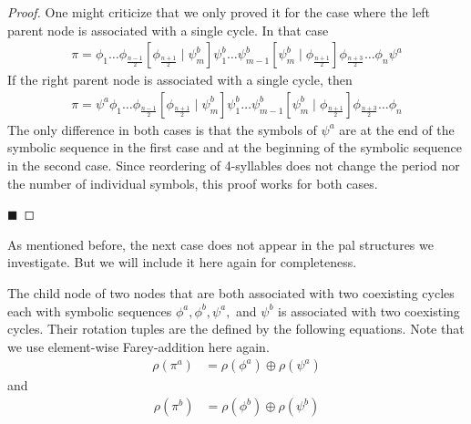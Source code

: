 \begin{proof}
	One might criticize that we only proved it for the case where the left parent node is associated with a single cycle.
	In that case
	\begin{align*}
		\pi = \phi_1 \dots \phi_{\frac{n-1}{2}} \left[\phi_{\frac{n+1}{2}} \mid \psi^b_m\right] \psi^b_1 \dots \psi^b_{m-1} \left[\psi^b_m \mid \phi_{\frac{n+1}{2}}\right] \phi_{\frac{n+3}{2}} \dots \phi_n \psi^a
	\end{align*}
	If the right parent node is associated with a single cycle, then
	\begin{align*}
		\pi = \psi^a \phi_1 \dots \phi_{\frac{n-1}{2}} \left[\phi_{\frac{n+1}{2}} \mid \psi^b_m\right] \psi^b_1 \dots \psi^b_{m-1} \left[\psi^b_m \mid \phi_{\frac{n+1}{2}}\right] \phi_{\frac{n+3}{2}} \dots \phi_n
	\end{align*}
	The only difference in both cases is that the symbols of $\psi^a$ are at the end of the symbolic sequence in the first case and at the beginning of the symbolic sequence in the second case.
	Since reordering of 4-syllables does not change the period nor the number of individual symbols, this proof works for both cases.

	\hfill $\blacksquare$
\end{proof}

As mentioned before, the next case does not appear in the \gls{pal} structures we investigate.
But we will include it here again for completeness.

\begin{theorem}
	The child node of two nodes that are both associated with two coexisting cycles each with symbolic sequences $\phi^a, \phi^b, \psi^a,$ and $\psi^b$ is associated with two coexisting cycles.
	Their rotation tuples are the defined by the following equations.
	Note that we use element-wise Farey-addition here again.
	\begin{align}
		\rho(\pi^a) & = \rho(\phi^a) \oplus \rho(\psi^a)
	\end{align}
	and
	\begin{align}
		\rho(\pi^b) & = \rho(\phi^b) \oplus \rho(\psi^b)
	\end{align}
\end{theorem}

